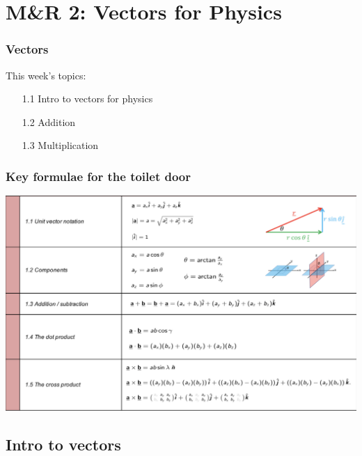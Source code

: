  

\section{M\&R 2: Vectors for Physics}
\begin{frame}
\frametitle{Vectors} 
\normalsize

This week's topics:\\[3ex]

\begin{itemize}
\item[1.1] Intro to vectors for physics\\[3ex]
\item[1.2] Addition\\[3ex]
\item[1.3] Multiplication\\[3ex]
\end{itemize}
\end{frame} 
 
 \begin{frame}
\frametitle{Key formulae for the toilet door}

\includegraphics[scale=0.34]{keyf-vectors}
\end{frame}

 \subsection{Intro to vectors}

